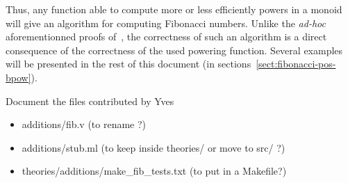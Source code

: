 Thus, any function able to compute more or less efficiently powers in a monoid will
give an algorithm for computing Fibonacci numbers. Unlike the \emph{ad-hoc} aforementionned proofs of~\cite{BC04}, the correctness of such an algorithm is a direct consequence 
of the correctness of the used powering function.
Several examples will be presented in the rest of this document
(in sections~\vref{sect:fibonacci-pos-bpow}).










\begin{todo}
Document the files contributed by Yves
\begin{itemize}
\item additions/fib.v (to rename ?)
\item additions/stub.ml (to keep inside theories/ or move to src/ ?)
\item theories/additions/make\_fib\_tests.txt (to put in a Makefile?)
\end{itemize}
\end{todo}








